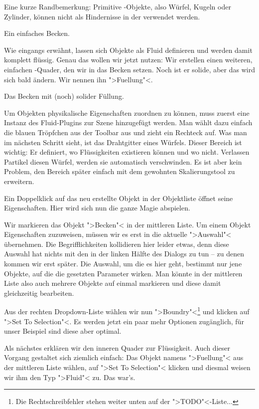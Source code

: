 \documentclass[10pt,DIV=14,a4paper]{scrartcl}
\begin{document}
Eine kurze Randbemerkung: Primitive \aoi-Objekte, also Würfel, Kugeln
oder Zylinder, können nicht als Hindernisse in der \fluidsim verwendet
werden.

{Ein einfaches Becken.}

Wie eingangs erwähnt, lassen sich Objekte als Fluid definieren und
werden damit komplett flüssig. Genau das wollen wir jetzt nutzen: Wir
erstellen einen weiteren, einfachen \PolyMesh-Quader, den wir in das
Becken setzen. Noch ist er solide, aber das wird sich bald ändern. Wir
nennen ihn ">Fuellung"<.

{Das Becken mit (noch) solider Füllung.}

Um Objekten physikalische Eigenschaften zuordnen zu können, muss zuerst
eine Instanz des Fluid-Plugins zur Szene hinzugefügt werden. Man wählt
dazu einfach die blauen Tröpfchen aus der Toolbar aus und zieht ein
Rechteck auf. Was man im nächsten Schritt sieht, ist das Drahtgitter
eines Würfels. Dieser Bereich ist wichtig: Er definiert, wo
Flüssigkeiten existieren können und wo nicht. Verlassen Partikel diesen
Würfel, werden sie automatisch verschwinden. Es ist aber kein Problem,
den Bereich später einfach mit dem gewohnten Skalierungstool zu
erweitern.

Ein Doppelklick auf das neu erstellte Objekt in der Objektliste öffnet
seine Eigenschaften. Hier wird sich nun die ganze Magie abspielen.

Wir markieren das Objekt ">Becken"< in der mittleren
Liste. Um einem Objekt Eigenschaften zuzuweisen, müssen
wir es erst in die aktuelle ">Auswahl"< übernehmen. Die
Begrifflichkeiten kollidieren hier leider etwas, denn diese Auswahl hat
nichts mit den  in der linken Hälfte des Dialogs
zu tun -- zu denen kommen wir erst später. Die Auswahl, um die es hier
geht, bestimmt nur jene Objekte, auf die die gesetzten Parameter wirken.
Man könnte in der mittleren Liste also auch mehrere Objekte auf einmal
markieren und diese damit gleichzeitig bearbeiten.

Aus der rechten Dropdown-Liste wählen wir nun ">Boundry"<\footnote{Die
Rechtschreibfehler stehen weiter unten auf der ">TODO"<-Liste...} und
klicken auf ">Set To Selection"<. Es werden jetzt ein paar mehr Optionen
zugänglich, für unser Beispiel sind diese aber optimal.

Als nächstes erklären wir den inneren Quader zur
Flüssigkeit. Auch dieser Vorgang gestaltet sich ziemlich
einfach: Das Objekt namens ">Fuellung"< aus der mittleren Liste wählen,
auf ">Set To Selection"< klicken und diesmal weisen wir ihm den Typ
">Fluid"< zu. Das war's.
\end{document}
